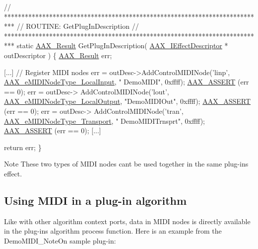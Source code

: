 \begin{DoxyCode}
\textcolor{comment}{// ***************************************************************************}
\textcolor{comment}{// ROUTINE: GetPlugInDescription}
\textcolor{comment}{// ***************************************************************************}
\textcolor{keyword}{static} \hyperlink{a00149_a4d8f69a697df7f70c3a8e9b8ee130d2f}{AAX\_Result} GetPlugInDescription( \hyperlink{a00096}{AAX\_IEffectDescriptor} * 
      outDescriptor )
\{
    \hyperlink{a00149_a4d8f69a697df7f70c3a8e9b8ee130d2f}{AAX\_Result}                    err;
    
    [...]
    \textcolor{comment}{// Register MIDI nodes}
    err = outDesc->AddControlMIDINode(\textcolor{stringliteral}{'linp'}, \hyperlink{a00206_a5e1dffce35d05990dbbad651702678e4ae57de2b04978fe2e75f5bdeb034bda44}{AAX\_eMIDINodeType\_LocalInput}, \textcolor{stringliteral}{"
      DemoMIDI"}, 0xffff);        \hyperlink{a00158_a168ee44fd7a5485ab50160db36fb2988}{AAX\_ASSERT} (err == 0);
    err = outDesc-> AddControlMIDINode(\textcolor{stringliteral}{'lout'}, \hyperlink{a00206_a5e1dffce35d05990dbbad651702678e4acc1b5f2109c508b20a65b5e0fdcd643f}{AAX\_eMIDINodeType\_LocalOutput}, \textcolor{stringliteral}{
      "DemoMIDIOut"}, 0xffff);  \hyperlink{a00158_a168ee44fd7a5485ab50160db36fb2988}{AAX\_ASSERT} (err == 0);
    err = outDesc-> AddControlMIDINode(\textcolor{stringliteral}{'tran'}, \hyperlink{a00206_a5e1dffce35d05990dbbad651702678e4ac2ff856aec0724907dfd95b8e3ccbc20}{AAX\_eMIDINodeType\_Transport}, \textcolor{stringliteral}{"
      DemoMIDITrnsprt"}, 0xffff);  \hyperlink{a00158_a168ee44fd7a5485ab50160db36fb2988}{AAX\_ASSERT} (err == 0);
    [...]

    \textcolor{keywordflow}{return} err;
\}
\end{DoxyCode}


\begin{DoxyNote}{Note}
These two types of M\+I\+D\+I nodes can\textquotesingle{}t be used together in the same plug-\/in\textquotesingle{}s effect.
\end{DoxyNote}
\hypertarget{a00336_additionalFeatures_MIDI_Algorithm}{}\subsection{Using M\+I\+D\+I in a plug-\/in algorithm}\label{a00336_additionalFeatures_MIDI_Algorithm}
Like with other algorithm context ports, data in M\+I\+D\+I nodes is directly available in the plug-\/in\textquotesingle{}s algorithm process function. Here is an example from the Demo\+M\+I\+D\+I\+\_\+\+Note\+On sample plug-\/in\+:


